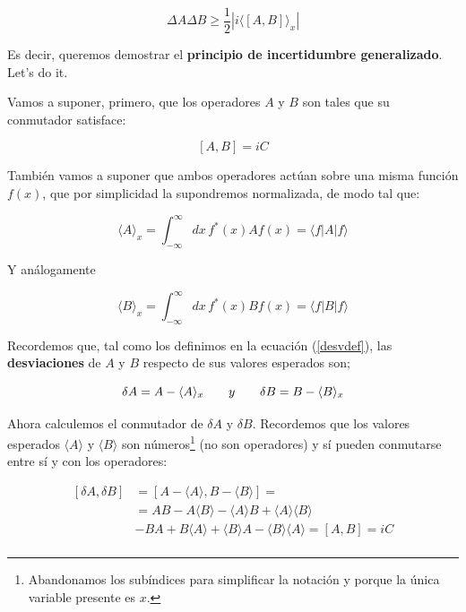 \begin{equation}
    \Delta A \Delta B \geq \frac{1}{2}\left| i \langle \left[A,B\right]\rangle_x\right|
\end{equation}

Es decir, queremos demostrar el \textbf{principio de incertidumbre generalizado}\cite[][p.27]{atkins}. Let's do it.

Vamos a suponer, primero, que los operadores $A$ y $B$ son tales que su conmutador satisface:

\begin{equation}
    \left[A,B\right]=i C
\end{equation}

También vamos a suponer que ambos operadores actúan sobre una misma función $f(x)$, que por simplicidad la supondremos normalizada, de modo tal que:

\begin{equation}
    \langle A \rangle_x = \int_{-\infty}^{\infty}dx\,f^*(x) A f(x)=\langle f|A|f\rangle 
\end{equation}

Y análogamente

\begin{equation}
    \langle B \rangle_x = \int_{-\infty}^{\infty}dx\,f^*(x) B f(x)=\langle f|B|f\rangle 
\end{equation}

Recordemos que, tal como los definimos en la ecuación (\ref{desvdef}), las \textbf{desviaciones} de $A$ y $B$ respecto de sus valores esperados son;

\begin{equation}
    \delta A = A - \langle A \rangle_x \hspace{0.7cm} y \hspace{0.7cm} \delta B = B - \langle B \rangle_x
\end{equation}

Ahora calculemos el conmutador de $\delta A$ y $\delta B$. Recordemos que los valores esperados $\langle A \rangle$ y $\langle B \rangle$ son números\footnote{Abandonamos los subíndices para simplificar la notación y porque la única variable presente es $x.$} (no son operadores) y sí pueden conmutarse entre sí y con los operadores:

\begin{equation}
    \begin{split}
   \left[\delta A, \delta B \right] &= \left[A - \langle A \rangle , B - \langle B \rangle \right]= \\
   &=AB-A\langle B \rangle - \langle A \rangle B + \langle A \rangle\langle B \rangle\\
   &-BA+B\langle A \rangle+\langle B \rangle A-\langle B \rangle\langle A \rangle = \left[A,B\right]=iC\\
    \end{split}
\end{equation}

